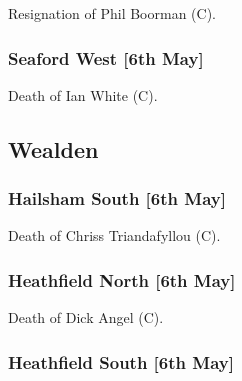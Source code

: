 \documentclass[a4paper,openany]{book}
\begin{document}
\begin{resultsiii}

Resignation of Phil Boorman (C).

\subsubsection*{Seaford West \hspace*{\fill}\nolinebreak[1]%
	\enspace\hspace*{\fill}
	[6th May]}


Death of Ian White (C).

\subsection*{Wealden}

\subsubsection*{Hailsham South \hspace*{\fill}\nolinebreak[1]%
	\enspace\hspace*{\fill}
	[6th May]}


Death of Chriss Triandafyllou (C).

\subsubsection*{Heathfield North \hspace*{\fill}\nolinebreak[1]%
	\enspace\hspace*{\fill}
	[6th May]}


Death of Dick Angel (C).

\subsubsection*{Heathfield South \hspace*{\fill}\nolinebreak[1]%
	\enspace\hspace*{\fill}
	[6th May]}



\end{resultsiii}
\end{document}
